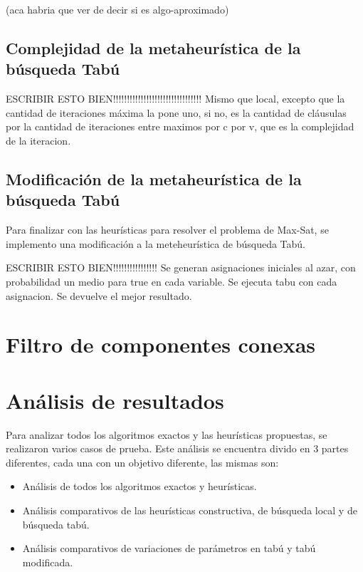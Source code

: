 \documentclass[a4paper,10pt]{article}
\begin{document}
(aca habria que ver de decir si es algo-aproximado)

\subsection*{Complejidad de la metaheur\'istica de la b\'usqueda Tab\'u}


ESCRIBIR ESTO BIEN!!!!!!!!!!!!!!!!!!!!!!!!!!!!!!!!
Mismo que local, excepto que la cantidad de iteraciones máxima la pone uno, si no, es la cantidad de cláusulas por la cantidad de iteraciones entre maximos por c  por v, que es la complejidad de la iteracion.


\subsection*{Modificaci\'on de la metaheur\'istica de la b\'usqueda Tab\'u}

Para finalizar con las heur\'isticas para resolver el problema de Max-Sat, se implemento una modificaci\'on a la meteheur\'istica de b\'usqueda Tab\'u.

ESCRIBIR ESTO BIEN!!!!!!!!!!!!!!!!
Se generan asignaciones iniciales al azar, con probabilidad un medio para true en cada variable. Se ejecuta tabu con cada asignacion. Se devuelve el mejor resultado.

\section*{Filtro de componentes conexas}


\section*{An\'alisis de resultados}


Para analizar todos los algoritmos exactos y las heur\'isticas propuestas, se realizaron varios casos de prueba. Este an\'alisis se encuentra divido en 3 partes diferentes, cada una con un objetivo diferente, las mismas son:

\begin{itemize}
\item An\'alisis de todos los algoritmos exactos y heur\'isticas.
\item An\'alisis comparativos de las heur\'isticas constructiva, de b\'usqueda local y de b\'usqueda tab\'u.
\item An\'alisis comparativos de variaciones de par\'ametros en tab\'u y tab\'u modificada.
\end{itemize}
 
\end{document}
